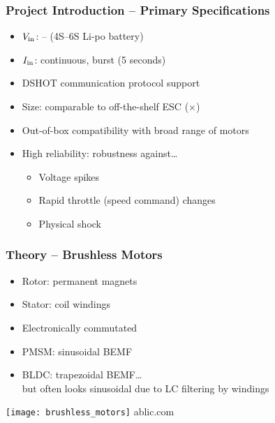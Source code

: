 \begin{frame}\frametitle{Project Introduction -- Primary Specifications}
	\begin{itemize}
		\item $V_{\text{in}}$: -- (4S--6S Li-po battery)
		\item $I_{\text{in}}$:  continuous,  burst (5 seconds)
		\item DSHOT communication protocol support
		\item Size: comparable to off-the-shelf ESC ($\times$)
		\item Out-of-box compatibility with broad range of motors
		\item High reliability: robustness against\ldots
		\begin{itemize}
			\item Voltage spikes
			\item Rapid throttle (speed command) changes
			\item Physical shock
		\end{itemize}
	\end{itemize}
\end{frame}
\begin{frame}\frametitle{Theory -- Brushless Motors}
	\begin{minipage}{0.5\textwidth}
		\begin{itemize}
			\item Rotor: permanent magnets
			\item Stator: coil windings
			\item Electronically commutated
			\item PMSM: sinusoidal BEMF
			\item BLDC: trapezoidal BEMF\ldots \\
			but often looks sinusoidal due to LC filtering by windings
		\end{itemize}
	\end{minipage}%
	\begin{minipage}{0.5\textwidth}
		\texttt{[image: brushless\_motors]}
		{\scriptsize ablic.com}
		\begin{center}
			
		\end{center}
	\end{minipage}
\end{frame}
